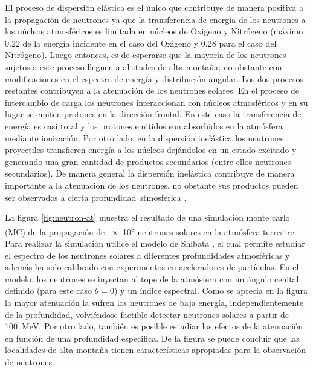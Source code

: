 El proceso de dispersión elástica es el único que contribuye de manera positiva a la propagación de neutrones ya que la transferencia de energía de los neutrones a los núcleos atmosféricos es limitada en núcleos de Oxigeno y Nitrógeno (máximo $0.22$ de la energía incidente en el caso del Oxigeno y $0.28$ para el caso del Nitrógeno). Luego entonces, es de esperarse que la mayoría de los neutrones sujetos a este proceso lleguen a altitudes de alta montaña; no obstante con modificaciones en el espectro de energía y distribución angular. Los dos procesos restantes contribuyen a la atenuación de los neutrones solares. En el proceso de intercambio de carga los neutrones interaccionan con núcleos atmosféricos y en su lugar se emiten protones en la dirección frontal. En este caso la transferencia de energía es casi total y los protones emitidos son absorbidos en la atmósfera mediante ionización. Por otro lado, en la dispersión inelástica los neutrones proyectiles transfieren energía a los núcleos dejándolos en un estado excitado y generando una gran cantidad de productos secundarios (entre ellos neutrones secundarios). De manera general la dispersión inelástica contribuye de manera importante a la atenuación de los neutrones, no obstante sus productos pueden ser observados a cierta profundidad atmosférica \cite{shibata94}.

La figura \ref{fig:neutron-at} muestra el resultado de una simulación monte carlo (MC) de la propagación de \num{e8} neutrones solares en la atmósfera terrestre. Para realizar la simulación utilicé el modelo de Shibata \cite{shibata94}, el cual permite estudiar el espectro de los neutrones solares a diferentes profundidades atmosféricas y además ha sido calibrado con experimentos en aceleradores de partículas. En el modelo, los neutrones se inyectan al tope de la atmósfera con un ángulo cenital definido (para este caso $\theta=0$) y un índice espectral. Como se aprecia en la figura la mayor atenuación la sufren los neutrones de baja energía, independientemente de la profundidad, volviéndose factible detectar neutrones solares a partir de \SI{100}{\mega\electronvolt}. Por otro lado, también es posible estudiar los efectos de la atenuación en función de una profundidad especifica. De la figura se puede concluir que las localidades de alta montaña tienen características apropiadas para la observación de neutrones.

